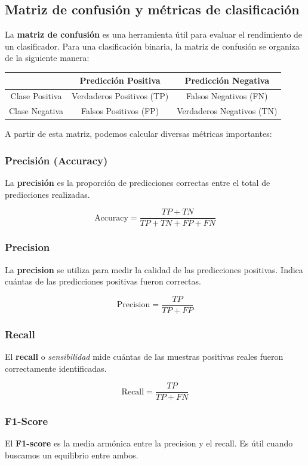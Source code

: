 \documentclass[a4paper, 11pt]{article}
\begin{document}
\subsection{Matriz de confusión y métricas de clasificación}

La \textbf{matriz de confusión} es una herramienta útil para evaluar el rendimiento de un clasificador. Para una clasificación binaria, la matriz de confusión se organiza de la siguiente manera:

\begin{center}
\begin{tabular}{|c|c|c|}
 \hline
   & Predicción Positiva & Predicción Negativa \\
 \hline
 Clase Positiva & Verdaderos Positivos (TP) & Falsos Negativos (FN) \\
 \hline
 Clase Negativa & Falsos Positivos (FP) & Verdaderos Negativos (TN) \\
 \hline
\end{tabular}
\end{center}

A partir de esta matriz, podemos calcular diversas métricas importantes:

\subsubsection{Precisión (Accuracy)}
La \textbf{precisión} es la proporción de predicciones correctas entre el total de predicciones realizadas.

\[
\text{Accuracy} = \frac{TP + TN}{TP + TN + FP + FN}
\]

\subsubsection{Precision}
La \textbf{precision} se utiliza para medir la calidad de las predicciones positivas. Indica cuántas de las predicciones positivas fueron correctas.

\[
\text{Precision} = \frac{TP}{TP + FP}
\]

\subsubsection{Recall}
El \textbf{recall} o \textit{sensibilidad} mide cuántas de las muestras positivas reales fueron correctamente identificadas.

\[
\text{Recall} = \frac{TP}{TP + FN}
\]

\subsubsection{F1-Score}
El \textbf{F1-score} es la media armónica entre la precision y el recall. Es útil cuando buscamos un equilibrio entre ambos.
\end{document}
